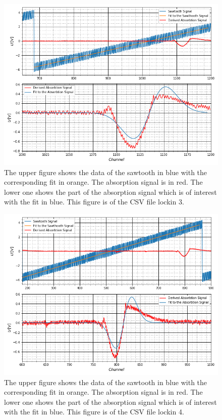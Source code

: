 	\begin{figure}[ht]
		\includegraphics[scale=0.5]{Bild/LockIn3.png}
		\centering
		\caption[Plots and Fits of Lock-In Method 3]{\small The upper figure shows the data of the sawtooth in blue with the corresponding fit in orange. The absorption signal is in red. The lower one shows the part of the absorption signal which is of interest with the fit in blue. This figure is of the CSV file lockin 3.}
		\label{Lock3}
	\end{figure}
	\begin{figure}[ht]
		\includegraphics[scale=0.5]{Bild/LockIn4.png}
		\centering
		\caption[Plots and Fits of Lock-In Method 4]{\small The upper figure shows the data of the sawtooth in blue with the corresponding fit in orange. The absorption signal is in red. The lower one shows the part of the absorption signal which is of interest with the fit in blue. This figure is of the CSV file lockin 4.}
		\label{Lock4}
	\end{figure}
